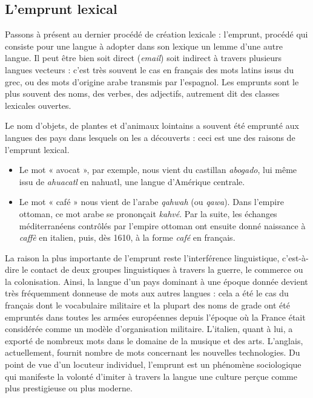 \subsection{L’emprunt lexical}
Passons à présent au dernier procédé de création lexicale : l’emprunt, procédé qui consiste pour une langue à adopter dans son lexique un lemme d’une autre langue. Il peut être bien soit direct (\textit{email}) soit
indirect à travers plusieurs langues vecteurs : c’est très souvent le cas en français des mots latins issus du grec, ou des mots d’origine arabe transmis par l’espagnol. Les emprunts sont le plus souvent des noms, des verbes, des adjectifs, autrement dit des classes lexicales ouvertes.

Le nom d’objets, de plantes et d’animaux lointains a souvent été emprunté aux langues des pays dans lesquels on les a découverts : ceci est une des raisons de l’emprunt lexical.
\begin{itemize}
\item Le mot « avocat », par exemple, nous vient du castillan \textit{abogado}, lui même issu de \textit{ahuacatl} en nahuatl, une langue d’Amérique centrale.
\item Le mot « café » nous vient de l’arabe \textit{qahwah} (ou \textit{qawa}). Dans l’empire ottoman, ce mot arabe se prononçait \textit{kahvé}. Par la suite, les échanges méditerranéens contrôlés par l’empire ottoman ont ensuite donné naissance à \textit{caffè} en italien, puis, dès 1610, à la forme \textit{café} en français.
\end{itemize}
La raison la plus importante de l’emprunt reste l’interférence linguistique, c’est-à-dire le contact de deux groupes linguistiques à travers la guerre, le commerce ou la colonisation. Ainsi, la langue d’un pays dominant à une époque donnée devient très fréquemment donneuse de mots aux autres langues : cela a été le cas du français dont le vocabulaire militaire et la plupart des noms de grade ont été empruntés dans toutes les armées européennes depuis l’époque où la France était considérée comme un modèle d’organisation militaire. L’italien, quant à lui, a exporté de nombreux mots dans le domaine de la musique et des arts. L’anglais, actuellement, fournit nombre de mots concernant les nouvelles technologies. Du point de vue d’un locuteur individuel, l’emprunt est un phénomène sociologique qui manifeste la volonté d’imiter à travers la langue une culture perçue comme plus prestigieuse ou plus moderne.

